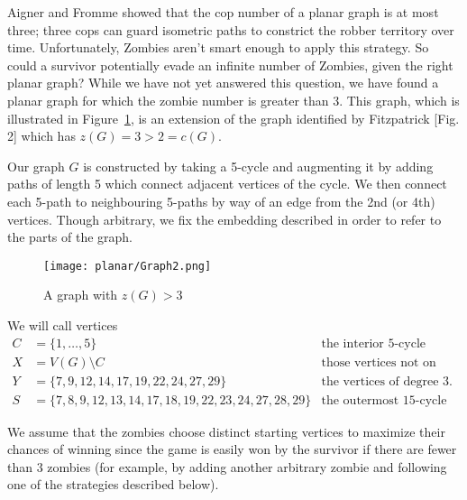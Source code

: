 Aigner and Fromme \cite{aigner1984game} showed that the cop number of a planar graph is at most three;
three cops can guard isometric paths to constrict the robber territory over time.
Unfortunately, Zombies aren't smart enough to apply this strategy. So could a survivor
potentially evade an infinite number of Zombies, given the right planar graph?
While we have not yet answered this question, we have found a planar graph for which the zombie number is greater than 3.
This graph, which is illustrated in Figure~\ref{fig:planarG2}, is an extension of the graph
identified by Fitzpatrick \cite{fitzpatrick2016deterministic}[Fig. 2] which has
$z(G) = 3 > 2 = c(G)$.

Our graph $G$ is constructed by taking a 5-cycle and augmenting it by adding paths of length 5 which
connect adjacent vertices of the cycle. We then connect each 5-path to neighbouring 5-paths by way of an edge from the 2nd (or 4th) vertices. Though arbitrary, we fix the embedding described in order to refer to the parts of the graph.

\begin{figure}
\centering
\texttt{[image: planar/Graph2.png]}
\caption{A graph with $z(G) > 3$ \label{fig:planarG2}}
\end{figure}

We will call vertices
\begin{align*}
C &= \{ 1, \dots, 5 \} & \text{the interior 5-cycle} \\
X &= V(G) \setminus C & \text{those vertices not on the interior 5-cycle} \\
Y &= \{7, 9, 12, 14, 17, 19, 22, 24, 27, 29\} & \text{the vertices of degree 3.} \\
S &= \{ 7,8,9,12,13,14,17,18,19, 22,23,24,27,28,29 \} & \text{the outermost 15-cycle}
\end{align*}

We assume that the zombies choose distinct starting vertices to maximize their chances of winning since the game is easily won by the survivor
if there are fewer than 3 zombies (for example, by adding another arbitrary zombie and following one of the strategies described below).



